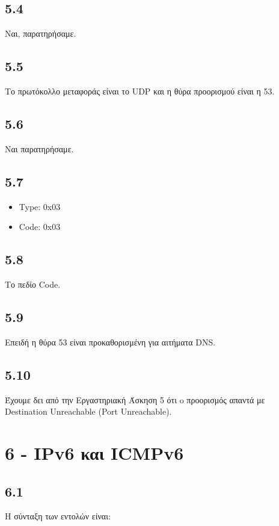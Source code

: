 		\subsection*{5.4}
			Ναι, παρατηρήσαμε.

		\subsection*{5.5}
			Το πρωτόκολλο μεταφοράς είναι το UDP και η θύρα προορισμού είναι η 53.

		\subsection*{5.6}
			Ναι παρατηρήσαμε.

		\subsection*{5.7}
			\begin{itemize}
				\item Type: 0x03
				\item Code: 0x03
			\end{itemize}

		\subsection*{5.8}
			Το πεδίο Code. 

		\subsection*{5.9}
			Επειδή η θύρα 53 είναι προκαθορισμένη για αιτήματα DNS.

		\subsection*{5.10}
			Έχουμε δει από την Εργαστηριακή Άσκηση 5 ότι o προορισμός απαντά με Destination Unreachable (Port Unreachable).
	
	\section*{6 - IPv6 και ICMPv6}

		\subsection*{6.1}
			Η σύνταξη των εντολών είναι: \\
			
